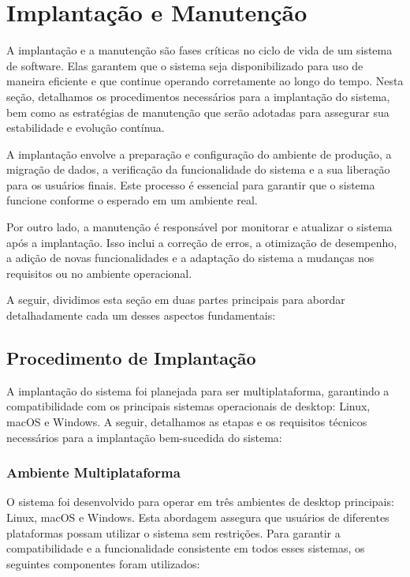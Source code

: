 \documentclass[../main.tex]{subfiles}
\begin{document}
\section{Implantação e Manutenção}

A implantação e a manutenção são fases críticas no ciclo de vida de um sistema de software. Elas garantem que o sistema seja disponibilizado para uso de maneira eficiente e que continue operando corretamente ao longo do tempo. Nesta seção, detalhamos os procedimentos necessários para a implantação do sistema, bem como as estratégias de manutenção que serão adotadas para assegurar sua estabilidade e evolução contínua.

A implantação envolve a preparação e configuração do ambiente de produção, a migração de dados, a verificação da funcionalidade do sistema e a sua liberação para os usuários finais. Este processo é essencial para garantir que o sistema funcione conforme o esperado em um ambiente real.

Por outro lado, a manutenção é responsável por monitorar e atualizar o sistema após a implantação. Isso inclui a correção de erros, a otimização de desempenho, a adição de novas funcionalidades e a adaptação do sistema a mudanças nos requisitos ou no ambiente operacional.

A seguir, dividimos esta seção em duas partes principais para abordar detalhadamente cada um desses aspectos fundamentais:

\subsection{Procedimento de Implantação}

A implantação do sistema foi planejada para ser multiplataforma, garantindo a compatibilidade com os principais sistemas operacionais de desktop: Linux, macOS e Windows. A seguir, detalhamos as etapas e os requisitos técnicos necessários para a implantação bem-sucedida do sistema:

\subsubsection{Ambiente Multiplataforma}

O sistema foi desenvolvido para operar em três ambientes de desktop principais: Linux, macOS e Windows. Esta abordagem assegura que usuários de diferentes plataformas possam utilizar o sistema sem restrições. Para garantir a compatibilidade e a funcionalidade consistente em todos esses sistemas, os seguintes componentes foram utilizados:
\end{document}
